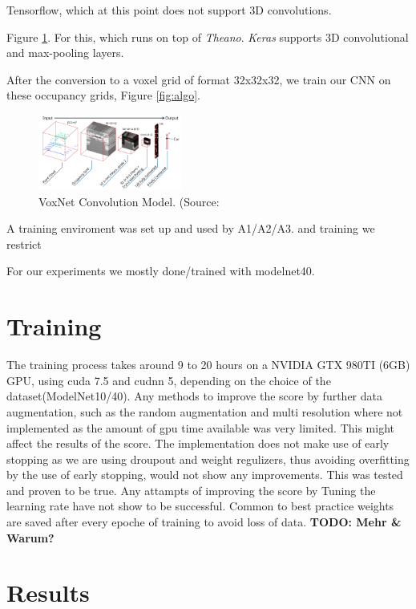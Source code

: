 \documentclass[10pt,twocolumn,letterpaper]{article}
\begin{document}
Tensorflow, which at this point does not support 3D convolutions.


Figure \ref{fig:model}. For this, which runs on top of \textit{Theano}. 
\textit{Keras} supports 3D convolutional and max-pooling layers. 

After the conversion to a voxel grid of format 32x32x32, we train our CNN on these occupancy grids, Figure \ref{fig:algo}.





\begin{figure}[h]
	\label{fig:model}
	\centering
	\includegraphics[width=0.42\textwidth]{figures/model}
	\caption{VoxNet Convolution Model. (Source: \cite{mature}}
\end{figure}

A training enviroment was set up and used by A1/A2/A3. and training
we restrict

For our experiments we mostly done/trained with modelnet40.


\section{Training}

The training process takes around 9 to 20 hours on a NVIDIA GTX 980TI (6GB) GPU, using cuda 7.5 and cudnn 5, depending on the choice of the dataset(ModelNet10/40). Any methods to improve the score by further data augmentation, such as the random augmentation and multi resolution where not implemented as the amount of gpu time available was very limited. This might affect the results of the score. 
The implementation does not make use of early stopping as we are using droupout and weight regulizers, thus avoiding overfitting by the use of early stopping, would not show any improvements. This was tested and proven to be true. Any attampts of improving the score by Tuning the learning rate have not show to be successful.
Common to best practice weights are saved after every epoche of training to avoid loss of data. \textbf{TODO: Mehr \& Warum?} \\ 

\section{Results}
\end{document}
